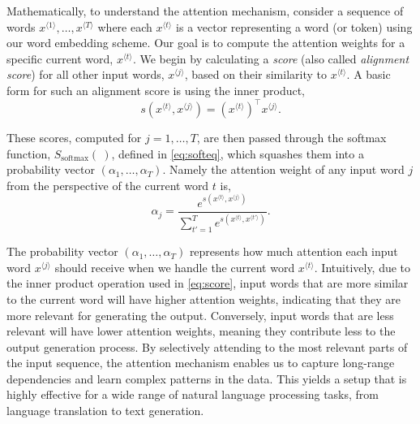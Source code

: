 \documentclass[12pt]{article}
\begin{document}
Mathematically, to understand the attention mechanism, consider a sequence of words $x^{{\langle 1 \rangle}},\ldots, x^{{\langle T \rangle}}$ where each $x^{{\langle t \rangle}}$ is a vector representing a word (or token) using our word embedding scheme. Our goal is to compute the attention weights for a specific current word, $x^{{\langle t \rangle}}$. %
We begin by calculating a {\em score} (also called {\em alignment score}) for all other input words, $x^{{\langle j \rangle}}$,  based on their similarity to $x^{{\langle t \rangle}}$. A basic form for such an alignment score is using the inner product,
%
\begin{equation}
\label{eq:score}
s(x^{{\langle t \rangle}},x^{{\langle j \rangle}})=(x^{{\langle t \rangle}})^\top x^{{\langle j \rangle}}.%
\end{equation}

These scores, computed for $j = 1,\ldots,T$, are then passed through the softmax function, $S_{\text{softmax}}(~)$, defined in \eqref{eq:softeq}, which squashes them into a probability vector $(\alpha_1, \ldots, \alpha_T)$. Namely the attention weight of any input word $j$ from the perspective of the current word $t$ is,
%
\begin{equation}
\label{eq:attentionweight}
\alpha_{j} = \frac{e^{s(x^{{\langle t \rangle}},x^{{\langle j \rangle}})}}{\sum_{t'=1}^T e^{s(x^{{\langle t \rangle}},x^{{\langle t' \rangle}})}}.
\end{equation}
%

The probability vector $(\alpha_1, \ldots, \alpha_T)$ represents how much attention each input word $x^{{\langle j \rangle}}$ should receive when we handle the current word $x^{{\langle t \rangle}}$. Intuitively, due to the inner product operation used in \eqref{eq:score}, input words that are more similar to the current word will have higher attention weights, indicating that they are more relevant for generating the output. Conversely, input words that are less relevant will have lower attention weights, meaning they contribute less to the output generation process. By selectively attending to the most relevant parts of the input sequence, the attention mechanism enables us to capture long-range dependencies and learn complex patterns in the data. This yields a setup that is highly effective for a wide range of natural language processing tasks, from language translation to text generation.

\end{document}
